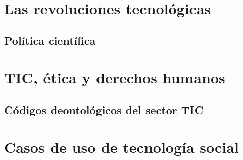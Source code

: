 \documentclass[a4paper]{book}
\begin{document}
\chapter{Las revoluciones tecnológicas}
\section{Política científica}

\chapter{TIC, ética y derechos humanos}
\section{Códigos deontológicos del sector TIC}

\chapter{Casos de uso de tecnología social}



% 
\end{document}
